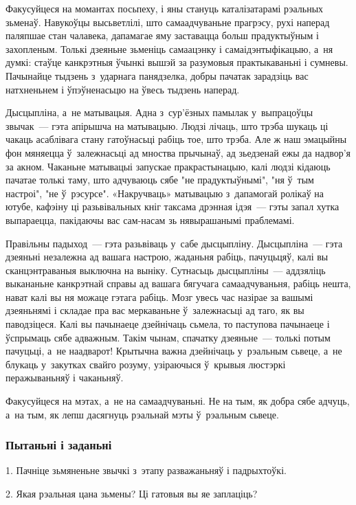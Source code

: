 Факусуйцеся на момантах посьпеху, і яны стануць каталізатарамі рэальных зьменаў. Навукоўцы высьветлілі, што самаадчуваньне прагрэсу, рухі наперад паляпшае стан чалавека, дапамагае яму заставацца больш прадуктыўным і захопленым. Толькі дзеяньне зьменіць самаацэнку і самаідэнтыфікацыю, а~ня думкі: стаўце канкрэтныя ўчынкі вышэй за разумовыя практыкаваньні і сумневы. Пачынайце тыдзень з~ударнага панядзелка, добры пачатак зарадзіць вас натхненьнем і ўпэўненасьцю на ўвесь тыдзень наперад.

Дысцыпліна, а~не матывацыя. Адна з~сур'ёзных памылак у~выпрацоўцы звычак~--- гэта апірышча на матывацыю. Людзі лічаць, што трэба шукаць ці чакаць асаблівага стану гатоўнасьці рабіць тое, што трэба. Але ж наш эмацыйны фон мяняецца ў~залежнасьці ад мноства прычынаў, ад зьедзенай ежы да надвор'я за акном. Чаканьне матывацыі запускае пракрастынацыю, калі людзі кідаюць пачатае толькі таму, што адчуваюць сябе "не прадуктыўнымі", "ня ў~тым настроі", "не ў~рэсурсе". «Накручваць» матывацыю з~дапамогай ролікаў на ютубе, кафэіну ці разьвівальных кніг таксама дрэнная ідэя~--- гэты запал хутка выпараецца, пакідаючы вас сам-насам зь нявырашанымі праблемамі.

Правільны падыход~--- гэта разьвіваць у~сабе дысцыпліну. Дысцыпліна~--- гэта дзеяньні незалежна ад вашага настрою, жаданьня рабіць, пачуцьцяў, калі вы сканцэнтраваныя выключна на выніку. Сутнасьць дысцыпліны~--- аддзяліць выкананьне канкрэтнай справы ад вашага бягучага самаадчуваньня, рабіць нешта, нават калі вы ня можаце гэтага рабіць. Мозг увесь час назірае за вашымі дзеяньнямі і складае пра вас меркаваньне ў~залежнасьці ад таго, як вы паводзіцеся. Калі вы пачынаеце дзейнічаць сьмела, то паступова пачынаеце і ўспрымаць сябе адважным. Такім чынам, спачатку дзеяньне~--- толькі потым пачуцьці, а~не наадварот! Крытычна важна дзейнічаць у~рэальным сьвеце, а~не блукаць у~закутках свайго розуму, узіраючыся ў~крывыя люстэркі перажываньняў і чаканьняў. 

Факусуйцеся на мэтах, а~не на самаадчуваньні. Не на тым, як добра сябе адчуць, а~на тым, як лепш дасягнуць рэальнай мэты ў~рэальным сьвеце.

\subsubsection{Пытаньні і заданьні}

1. Пачніце зьмяненьне звычкі з~этапу разважаньняў і падрыхтоўкі.

2. Якая рэальная цана зьмены? Ці гатовыя вы яе заплаціць?

